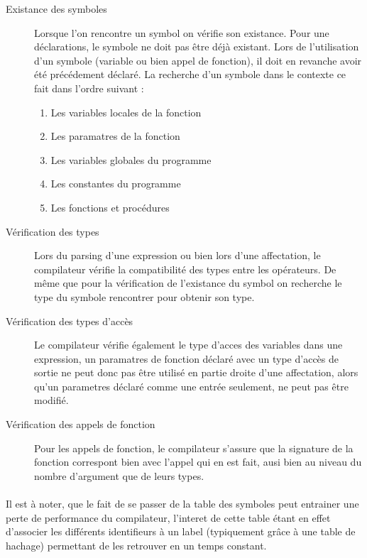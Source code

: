\begin{description}
 \item[Existance des symboles] Lorsque l'on rencontre un symbol on vérifie son 
existance. Pour une déclarations, le symbole ne doit pas être déjà existant. 
Lors de l'utilisation d'un symbole (variable ou bien appel de fonction), il doit
en revanche avoir été précédement déclaré. La recherche d'un symbole dans le
contexte ce fait dans l'ordre suivant :

 \begin{enumerate}
  \item Les variables locales de la fonction
  \item Les paramatres de la fonction
  \item Les variables globales du programme
  \item Les constantes du programme
  \item Les fonctions et procédures
 \end{enumerate}

 \item[Vérification des types] Lors du parsing d'une expression ou bien lors 
d'une affectation, le compilateur vérifie la compatibilité des types entre les
opérateurs. De même que pour la vérification de l'existance du symbol
on recherche le type du symbole rencontrer pour obtenir son type.

 \item[Vérification des types d'accès] Le compilateur vérifie également le type
d'acces des variables dans une expression, un paramatres de fonction
déclaré avec un type d'accès de sortie ne peut donc pas être utilisé en partie 
droite d'une affectation, alors qu'un parametres déclaré comme une entrée
seulement, ne peut pas être modifié.
 
 \item[Vérification des appels de fonction] Pour les appels de fonction, le 
compilateur s'assure que la signature de la fonction correspont bien avec 
l'appel qui en est fait, ausi bien au niveau du nombre d'argument que de leurs 
types.
\end{description}

\paragraph{}Il est à noter, que le fait de se passer de la table des symboles 
peut entrainer une perte de performance du compilateur, l'interet de cette 
table étant en effet d'associer les différents identifieurs à un label 
(typiquement grâce à une table de hachage) permettant de les 
retrouver en un temps constant.

